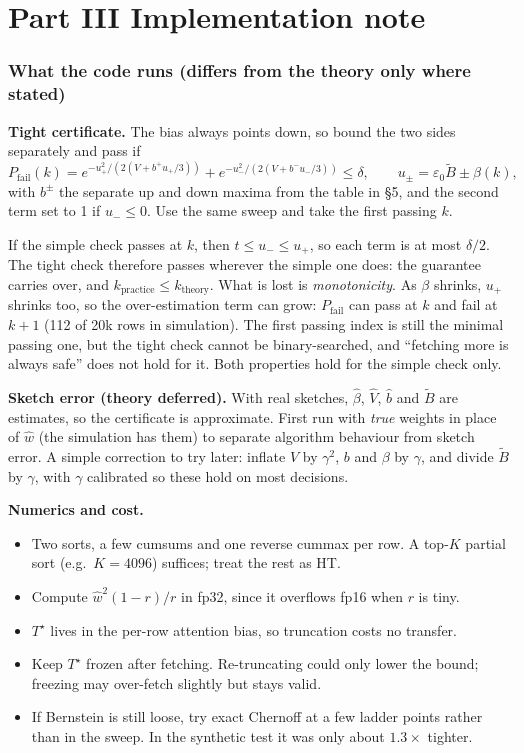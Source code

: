 \documentclass[11pt]{article}
\newcommand{\eps}{\varepsilon}
\theoremstyle{definition}
\theoremstyle{remark}
\begin{document}
\part*{Part III \quad Implementation note}

\section{What the code runs (differs from the theory only where stated)}

\textbf{Tight certificate.} The bias always points down, so bound the two sides separately and pass if
\[ P_{\mathrm{fail}}(k) = e^{-u_+^2 / (2(V + b^+ u_+/3))} + e^{-u_-^2 / (2(V + b^- u_-/3))} \le \delta, \qquad
u_\pm = \eps_0 \tilde B \pm \beta(k), \]
with $b^\pm$ the separate up and down maxima from the table in \S5, and the second term set to 1 if $u_- \le 0$. Use the same
sweep and take the first passing $k$.

\begin{tcolorbox}[colback=blue!3,colframe=blue!50!black,boxrule=0.4pt,arc=2pt,title=Why this is safe]
If the simple check passes at $k$, then $t \le u_- \le u_+$, so each term is at most $\delta/2$. The tight check therefore
passes wherever the simple one does: the guarantee carries over, and $k_{\mathrm{practice}} \le k_{\mathrm{theory}}$. What is
lost is \emph{monotonicity}. As $\beta$ shrinks, $u_+$ shrinks too, so the over-estimation term can grow: $P_{\mathrm{fail}}$
can pass at $k$ and fail at $k + 1$ (112 of 20k rows in simulation). The first passing index is still the minimal passing
one, but the tight check cannot be binary-searched, and ``fetching more is always safe'' does not hold for it. Both
properties hold for the simple check only.
\end{tcolorbox}

\textbf{Sketch error (theory deferred).} With real sketches, $\hat\beta$, $\hat V$, $\hat b$ and $\tilde B$ are estimates,
so the certificate is approximate. First run with \emph{true} weights in place of $\hat w$ (the simulation has them) to
separate algorithm behaviour from sketch error. A simple correction to try later: inflate $V$ by $\gamma^2$, $b$ and $\beta$ by
$\gamma$, and divide $\tilde B$ by $\gamma$, with $\gamma$ calibrated so these hold on most decisions.

\textbf{Numerics and cost.}
\begin{itemize}
\item Two sorts, a few cumsums and one reverse cummax per row. A top-$K$ partial sort (e.g.\ $K = 4096$) suffices; treat the
rest as HT.
\item Compute $\hat w^2(1 - r)/r$ in fp32, since it overflows fp16 when $r$ is tiny.
\item $T^\star$ lives in the per-row attention bias, so truncation costs no transfer.
\item Keep $T^\star$ frozen after fetching. Re-truncating could only lower the bound; freezing may over-fetch slightly but
stays valid.
\item If Bernstein is still loose, try exact Chernoff at a few ladder points rather than in the sweep. In the synthetic test it
was only about $1.3\times$ tighter.
\end{itemize}
\end{document}

